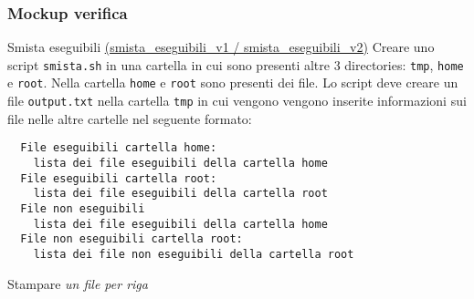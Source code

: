 
\subsubsection*{Mockup verifica}
\begin{esercizio}{Smista eseguibili \href{run:./files/linux/mockup_verifica/es1/v1}{(smista\_eseguibili\_v1 / }\href{run:./files/linux/mockup_verifica/es1/v2}{smista\_eseguibili\_v2)}}
	Creare uno script \verb|smista.sh| in una cartella in cui sono presenti altre 3 directories: \verb|tmp|, \verb|home| e \verb|root|. Nella cartella \verb|home| e \verb|root| sono presenti dei file. Lo script deve creare un file \verb|output.txt| nella cartella \verb|tmp| in cui vengono vengono inserite informazioni sui file nelle altre cartelle nel seguente formato:
	\begin{lstlisting}
  File eseguibili cartella home:
    lista dei file eseguibili della cartella home
  File eseguibili cartella root:
    lista dei file eseguibili della cartella root
  File non eseguibili
    lista dei file eseguibili della cartella home
  File non eseguibili cartella root:
    lista dei file non eseguibili della cartella root
  \end{lstlisting}
	Stampare \textit{un file per riga}
\end{esercizio}

